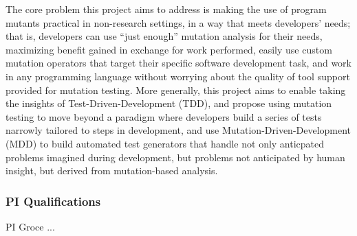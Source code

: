 The core problem this project aims to address is making the use of program mutants practical in non-research settings, in a way that meets developers' needs; that is, developers can use ``just enough'' mutation analysis for their needs, maximizing benefit gained in exchange for work performed, easily use custom mutation operators that target their specific software development task, and work in any programming language without worrying about the quality of tool support provided for mutation testing.  More generally, this project aims to enable taking the insights of Test-Driven-Development (TDD), and propose using mutation testing to move beyond a paradigm where developers build a series of tests narrowly tailored to steps in development, and use Mutation-Driven-Development (MDD) to build automated test generators that handle not only anticpated problems imagined during development, but problems not anticipated by human insight, but derived from mutation-based analysis.

\subsubsection{PI Qualifications}

PI Groce ...